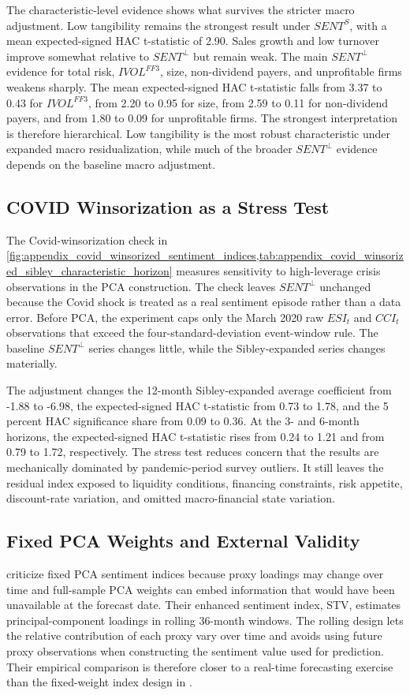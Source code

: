 \documentclass[11pt]{article}
\newcommand{\var}[1]{\ensuremath{#1}}
\begin{document}
The characteristic-level evidence shows what survives the stricter macro adjustment. Low tangibility remains the strongest result under \var{SENT^{S}}, with a mean expected-signed HAC t-statistic of 2.90. Sales growth and low turnover improve somewhat relative to \var{SENT^{\perp}} but remain weak. The main \var{SENT^{\perp}} evidence for total risk, \var{IVOL^{FF3}}, size, non-dividend payers, and unprofitable firms weakens sharply. The mean expected-signed HAC t-statistic falls from 3.37 to 0.43 for \var{IVOL^{FF3}}, from 2.20 to 0.95 for size, from 2.59 to 0.11 for non-dividend payers, and from 1.80 to 0.09 for unprofitable firms. The strongest interpretation is therefore hierarchical. Low tangibility is the most robust characteristic under expanded macro residualization, while much of the broader \var{SENT^{\perp}} evidence depends on the baseline macro adjustment.

\subsection{COVID Winsorization as a Stress Test}
The Covid-winsorization check in \cref{fig:appendix_covid_winsorized_sentiment_indices,tab:appendix_covid_winsorized_sibley_characteristic_horizon} measures sensitivity to high-leverage crisis observations in the PCA construction. The check leaves \var{SENT^{\perp}} unchanged because the Covid shock is treated as a real sentiment episode rather than a data error. Before PCA, the experiment caps only the March 2020 raw \var{ESI_t} and \var{CCI_t} observations that exceed the four-standard-deviation event-window rule. The baseline \var{SENT^{\perp}} series changes little, while the Sibley-expanded series changes materially.

The adjustment changes the 12-month Sibley-expanded average coefficient from -1.88 to -6.98, the expected-signed HAC t-statistic from 0.73 to 1.78, and the 5 percent HAC significance share from 0.09 to 0.36. At the 3- and 6-month horizons, the expected-signed HAC t-statistic rises from 0.24 to 1.21 and from 0.79 to 1.72, respectively. The stress test reduces concern that the results are mechanically dominated by pandemic-period survey outliers. It still leaves the residual index exposed to liquidity conditions, financing constraints, risk appetite, discount-rate variation, and omitted macro-financial state variation.

\subsection{Fixed PCA Weights and External Validity}
\citet{ung2024enhanced} criticize fixed PCA sentiment indices because proxy loadings may change over time and full-sample PCA weights can embed information that would have been unavailable at the forecast date. Their enhanced sentiment index, STV, estimates principal-component loadings in rolling 36-month windows. The rolling design lets the relative contribution of each proxy vary over time and avoids using future proxy observations when constructing the sentiment value used for prediction. Their empirical comparison is therefore closer to a real-time forecasting exercise than the fixed-weight index design in \citet{baker2006sentiment}.
\end{document}

